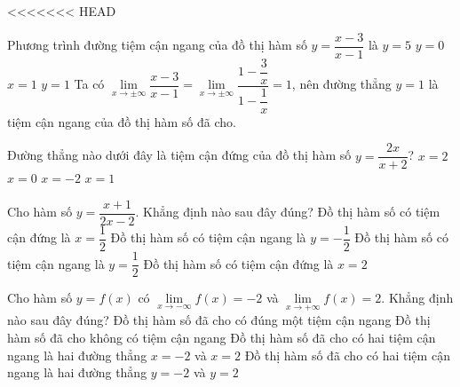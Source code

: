 <<<<<<< HEAD
\boxde
\BTTN
\begin{ex}%
    Phương trình đường tiệm cận ngang của đồ thị hàm số $y=\dfrac{x-3}{x-1}$ là
    \choice
    {$y=5$}
    {$y=0$}
    {$x=1$}
    {\True $y=1$}
    \loigiai
    {
        Ta có $\lim\limits_{x \to \pm \infty}\dfrac{x-3}{x-1} = \lim\limits_{x \to \pm \infty}\dfrac{1-\dfrac{3}{x}}{1-\dfrac{1}{x}}=1$, nên đường thẳng $y=1$ là tiệm cận ngang của đồ thị hàm số đã cho.
    }
\end{ex}


\begin{ex}
    Đường thẳng nào dưới đây là tiệm cận đứng của đồ thị hàm số $y=\dfrac{2x}{x+2}$?
    \choice
    {$x=2$}
    {$x=0$}
    {\True $x=-2$}
    {$x=1$}
\end{ex}

\begin{ex}%
    Cho hàm số $y=\dfrac{x+1}{2x-2}$. Khẳng định nào sau đây đúng?
    \choice
    {Đồ thị hàm số có tiệm cận đứng là $x=\dfrac{1}{2}$}
    {Đồ thị hàm số có tiệm cận ngang là $y=-\dfrac{1}{2}$}
    {\True Đồ thị hàm số có tiệm cận ngang là $y=\dfrac{1}{2}$}
    {Đồ thị hàm số có tiệm cận đứng là $x=2$}
\end{ex}


\begin{ex}%
    Cho hàm số $y=f(x)$ có $\lim\limits_{x\to -\infty} f(x)= -2$ và $\lim\limits_{x\to +\infty} f(x)= 2$. Khẳng định nào sau đây đúng?
    \choice
    {Đồ thị hàm số đã cho có đúng một tiệm cận ngang}
    {Đồ thị hàm số đã cho không có tiệm cận ngang}
    {Đồ thị hàm số đã cho có hai tiệm cận ngang là hai đường thẳng $x=-2$ và $x=2$}
    {\True Đồ thị hàm số đã cho có hai tiệm cận ngang là hai đường thẳng $y=-2$ và $y=2$}
\end{ex}

